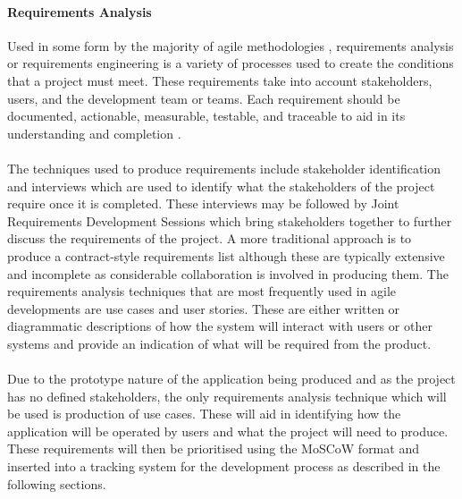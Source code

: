		\paragraph{Requirements Analysis}
			Used in some form by the majority of agile methodologies , requirements analysis or requirements engineering is a variety of processes used to create the conditions that a project must meet. These requirements take into account stakeholders, users, and the development team or teams. Each requirement should be documented, actionable, measurable, testable, and traceable to aid in its understanding and completion .
			\\\\
			The techniques used to produce requirements include stakeholder identification and interviews which are used to identify what the stakeholders of the project require once it is completed. These interviews may be followed by Joint Requirements Development Sessions which bring stakeholders together to further discuss the requirements of the project. A more traditional approach is to produce a contract-style requirements list although these are typically  extensive and incomplete as considerable collaboration is involved in producing them.  The  requirements analysis techniques that are most frequently used in agile developments are use cases and user stories. These are either written or diagrammatic descriptions of how the system will interact with users or other systems and provide an indication of what will be required from the product.
			\\\\
			Due to the prototype nature of the application being produced and as the project has no defined stakeholders, the only requirements analysis technique which will be used is production of use cases. These will aid in identifying how the application will be operated by users and what the project will need to produce. These requirements will then be prioritised using the MoSCoW format and inserted into a tracking system for the development process as  described in the following sections.
